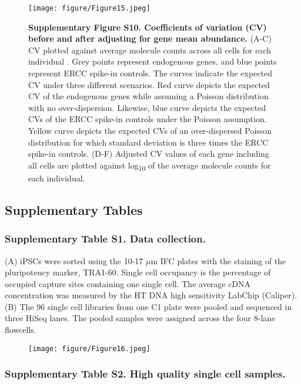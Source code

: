 \begin{figure}[htbp]
\centering
\texttt{[image: figure/Figure15.jpeg]}
\caption{\textbf{Supplementary Figure S10. Coefficients of variation
(CV) before and after adjusting for gene mean abundance.} (A-C) CV
plotted against average molecule counts across all cells for each
individual \citep{Islam2014}. Grey points represent endogenous genes, and
blue points represent ERCC spike-in controls. The curves indicate the
expected CV under three different scenarios. Red curve depicts the
expected CV of the endogenous genes while assuming a Poisson
distribution with no over-dispersion. Likewise, blue curve depicts the
expected CVs of the ERCC spike-in controls under the Poisson assumption.
Yellow curve depicts the expected CVs of an over-dispersed Poisson
distribution for which standard deviation is three times the ERCC
spike-in controls. (D-F) Adjusted CV values of each gene including all
cells are plotted against log\textsubscript{10} of the average molecule
counts for each individual.}
\end{figure}

\subsection{Supplementary Tables}\label{supplementary-tables}

\subsubsection{Supplementary Table S1. Data
collection.}\label{supplementary-table-s1.-data-collection.}

(A) iPSCs were sorted using the 10-17 $\mu$m IFC plates with the
staining of the pluripotency marker, TRA1-60. Single cell occupancy is
the percentage of occupied capture sites containing one single cell. The
average cDNA concentration was measured by the HT DNA high sensitivity
LabChip (Caliper). (B) The 96 single cell libraries from one C1 plate
were pooled and sequenced in three HiSeq lanes. The pooled samples were
assigned across the four 8-lane flowcells.

\begin{figure}[htbp]
\centering
\texttt{[image: figure/Figure16.jpeg]}
\end{figure}

\subsubsection{Supplementary Table S2. High quality single cell
samples.}\label{supplementary-table-s2.-high-quality-single-cell-samples.}

